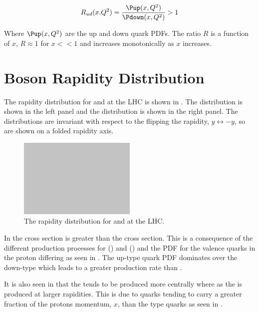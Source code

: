 \begin{equation}
  R_{ud}(x.Q^2) = \frac{\Pup(x,Q^2)}{ \Pdown(x,Q^2)} > 1
\end{equation}

Where $\Pup(x,Q^2)$ are the up and down quark \acp{PDF}.  
The ratio $R$ is a function of $x$, $R \approx 1$ for $x<<1$ and increases
monotonically as $x$ increases.  

\section{\PW Boson Rapidity Distribution}
\label{wbos:wrapsec}

The rapidity distribution for \PWp and \PWm at the \ac{LHC} is shown in
. 
The \PWm distribution is shown in the left panel and the \PWp distribution is
shown in the right panel. The distributions are invariant with respect to the
flipping the rapidity, $y\leftrightarrow-y$, so are shown on a folded rapidity
axis.

\begin{figure}[htb]
  \centering
  \includegraphics[width=0.5\textwidth]{placeholder}
  \caption{The rapidity distribution for \PWp and \PWm at the LHC.}
  \label{wbos:wrapid}
\end{figure}

In  the \PWp cross section is greater than the \PWm
cross section. This is a consequence of the different production processes for
\PWp () and \PWm () and the
\ac{PDF} for the valence quarks in the proton differing as seen in
. The up-type quark \ac{PDF} dominates over the
down-type which leads to a greater \PWp production rate than \PWm.

It is also seen in  that the \PWm tends to be produced
more centrally where as the \PWp is produced at larger rapidities. This is due
to \Pup quarks tending to carry a greater fraction of the protons momentum,
$x$, than the \Pdown type quarks as seen in .

